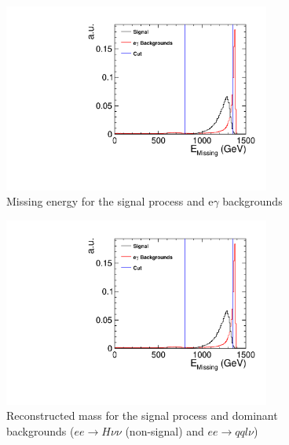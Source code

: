 \begin{figure}
  \centering
  \includegraphics[width=0.78\textwidth,keepaspectratio]{HiggsAnalysis/figures/EMissing_PreSelection_alt}
  \caption[Missing energy of signal and e$\gamma$ events]{Missing energy for the signal process and e$\gamma$ backgrounds}
  \label{fig:EMissPreSelAlt}
\end{figure}

\begin{figure}
  \centering
  \includegraphics[width=0.78\textwidth,keepaspectratio]{HiggsAnalysis/figures/EMissing_PreSelection_alt}
  \caption[Reconstructed W mass for signal and e$\gamma$ events]{Reconstructed mass for the signal process and dominant backgrounds ($ee\rightarrow H\nu\nu$ (non-signal) and $ee\rightarrow qql\nu$)}
  \label{fig:EMissPreSelAlt}
\end{figure}


